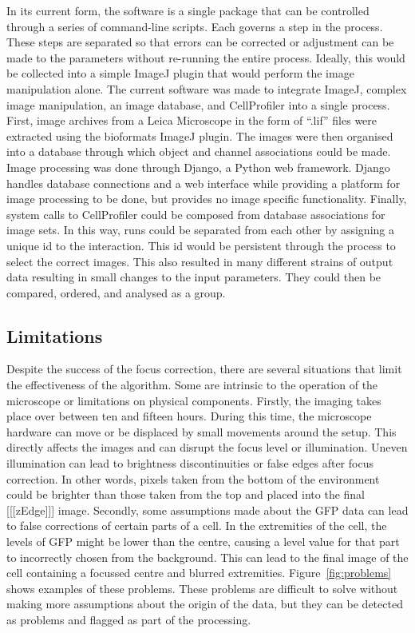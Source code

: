 \documentclass[preprint,11pt,5p,twocolumn]{elsarticle}
\begin{document}
In its current form, the software is a single package that can be controlled through a series of command-line scripts. Each governs a step in the process. These steps are separated so that errors can be corrected or adjustment can be made to the parameters without re-running the entire process. Ideally, this would be collected into a simple ImageJ plugin that would perform the image manipulation alone. The current software was made to integrate ImageJ, complex image manipulation, an image database, and CellProfiler into a single process. First, image archives from a Leica Microscope in the form of ``.lif'' files were extracted using the bioformats ImageJ plugin. The images were then organised into a database through which object and channel associations could be made. Image processing was done through Django, a Python web framework. Django handles database connections and a web interface while providing a platform for image processing to be done, but provides no image specific functionality. Finally, system calls to CellProfiler could be composed from database associations for image sets. In this way, runs could be separated from each other by assigning a unique id to the interaction. This id would be persistent through the process to select the correct images. This also resulted in many different strains of output data resulting in small changes to the input parameters. They could then be compared, ordered, and analysed as a group.

\subsection{Limitations}

Despite the success of the focus correction, there are several situations that limit the effectiveness of the algorithm. Some are intrinsic to the operation of the microscope or limitations on physical components. Firstly, the imaging takes place over between ten and fifteen hours. During this time, the microscope hardware can move or be displaced by small movements around the setup. This directly affects the images and can disrupt the focus level or illumination. Uneven illumination can lead to brightness discontinuities or false edges after focus correction. In other words, pixels taken from the bottom of the environment could be brighter than those taken from the top and placed into the final [[[zEdge]]] image. Secondly, some assumptions made about the GFP data can lead to false corrections of certain parts of a cell. In the extremities of the cell, the levels of GFP might be lower than the centre, causing a level value for that part to incorrectly chosen from the background. This can lead to the final image of the cell containing a focussed centre and blurred extremities. Figure~\ref{fig:problems} shows examples of these problems. These problems are difficult to solve without making more assumptions about the origin of the data, but they can be detected as problems and flagged as part of the processing.
\end{document}
